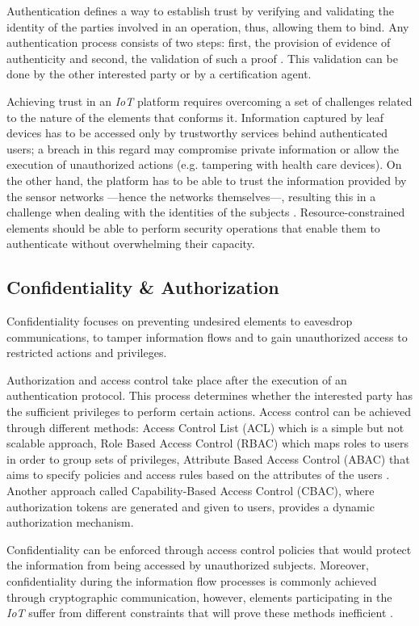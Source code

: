 \documentclass[journal]{IEEEtran}
\begin{document}
  Authentication defines a way to establish trust by verifying and validating the identity of the parties involved in an operation, thus, allowing them to bind. Any authentication process consists of two steps: first, the provision of evidence of authenticity and second, the validation of such a proof \cite{Sklavos2007}. This validation can be done by the other interested party or by a certification agent.

  Achieving trust in an \emph{IoT} platform requires overcoming a set of challenges related to the nature of the elements that conforms it. Information captured by leaf devices has to be accessed only by trustworthy services behind authenticated users; a breach in this regard may compromise private information or allow the execution of unauthorized actions (e.g. tampering with health care devices). On the other hand, the platform has to be able to trust the information provided by the sensor networks ---hence the networks themselves---, resulting this in a challenge when dealing with the identities of the subjects \cite{Kanuparthi2013}. Resource-constrained elements should be able to perform security operations that enable them to authenticate without overwhelming their capacity. 

  \subsection{Confidentiality \& Authorization}
  Confidentiality focuses on preventing undesired elements to eavesdrop communications, to tamper information flows and to gain unauthorized access to restricted actions and privileges.

  Authorization and access control take place after the execution of an authentication protocol. This process determines whether the interested party has the sufficient privileges to perform certain actions. Access control can be achieved through different methods: Access Control List (ACL) which is a simple but not scalable approach, Role Based Access Control (RBAC) which maps roles to users in order to group sets of privileges, Attribute Based Access Control (ABAC) that aims to specify policies and access rules based on the attributes of the users  \cite{Anggorojati2014}. Another approach called Capability-Based Access Control (CBAC), where authorization tokens are generated and given to users, provides a dynamic authorization mechanism.

  Confidentiality can be enforced through access control policies that would protect the information from being accessed by unauthorized subjects. Moreover, confidentiality during the information flow processes is commonly achieved through cryptographic communication, however, elements participating in the \emph{IoT} suffer from different constraints that will prove these methods inefficient \cite{Baldini2012}.    
\end{document}
